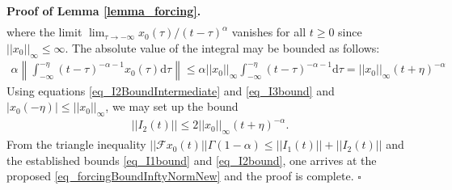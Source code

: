 \documentclass{svproc}
\renewenvironment{proof}[1][Proof]{\par\noindent\textbf{#1.} }{\hfill$\square$\par\vspace{1em}}
\newcommand{\dsomething}[1]{\mathrm{d}#1}
\newcommand{\CderivativeInput}[2]{{}^\mathrm{C}\operatorname{D}_{#2}^{#1}}
\begin{document}
\begin{proof}[Proof of Lemma \ref{lemma_forcing}]
\begin{align}
	\end{align} where the limit $\lim_{\tau\to-\infty}x_0(\tau)/(t-\tau)^\alpha$ vanishes for all $t\geq0$ since $||x_0||_\infty\leq \infty$. The absolute value of the integral may be bounded as follows:
	\begin{align}
		\alpha\left\lVert\int_{-\infty}^{-\eta}(t-\tau)^{-\alpha-1}x_0(\tau)\dsomething{\tau}\right\rVert\leq \alpha ||x_0||_\infty \int_{-\infty}^{-\eta}(t-\tau)^{-\alpha-1}\dsomething{\tau}=||x_0||_\infty (t+\eta)^{-\alpha} \label{eq_I3bound}
	\end{align}
	Using equations \eqref{eq_I2BoundIntermediate} and \eqref{eq_I3bound} and $|x_0(-\eta)|\leq||x_0||_\infty$, we may set up the bound
	\begin{align}
		||I_2(t)||\leq 2||x_0||_\infty (t+\eta)^{-\alpha}.\label{eq_I2bound}
	\end{align}From the triangle inequality $||\mathcal Fx_0(t)|| \Gamma(1-\alpha)\leq ||I_1(t)||+||I_2(t)||$ and the established bounds \eqref{eq_I1bound} and \eqref{eq_I2bound}, one arrives at the proposed \eqref{eq_forcingBoundInftyNormNew} and the proof is complete.
\end{proof}


			
			
\end{document}
